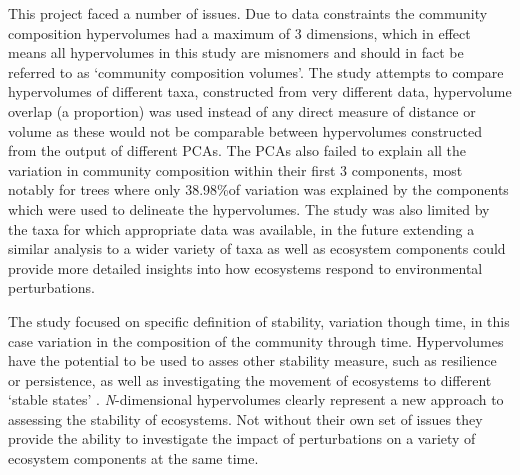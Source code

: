 This project faced a number of issues. Due to data constraints the community composition hypervolumes had a maximum of 3 dimensions, which in effect means all hypervolumes in this study are misnomers and should in fact be referred to as `community composition volumes'. The study attempts to compare hypervolumes of different taxa, constructed from very different data, hypervolume overlap (a proportion) was used instead of any direct measure of distance or volume as these would not be comparable between hypervolumes constructed from the output of different PCAs. The PCAs also failed to explain all the variation in community composition within their first 3 components, most notably for trees where only 38.98\%of variation was explained by the components which were used to delineate the hypervolumes. The study was also limited by the taxa for which appropriate data was available, in the future extending a similar analysis to a wider variety of taxa as well as ecosystem components could provide more detailed insights into how ecosystems respond to environmental perturbations.

The study focused on specific definition of stability, variation though time, in this case variation in the composition of the community through time. Hypervolumes have the potential to be used to asses other stability measure, such as resilience or persistence, as well as investigating the movement of ecosystems to different `stable states' \citep{Barros2016}. \emph{N}-dimensional hypervolumes clearly represent a new approach to assessing the stability of ecosystems. Not without their own set of issues they provide the ability to investigate the impact of perturbations on a variety of ecosystem components at the same time.


